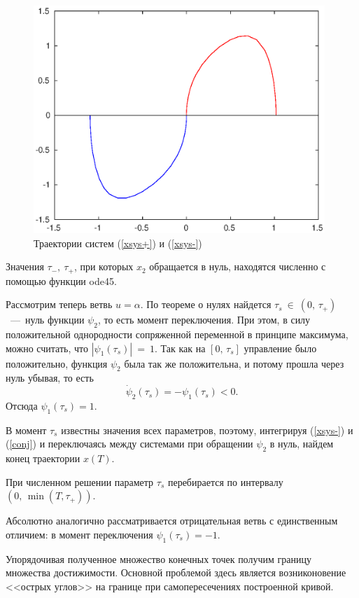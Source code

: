 \documentclass[16pt]{article}
\begin{document}
\begin{figure}[h]\label{pict}
\center
\includegraphics[width=110mm]{start.eps}
\caption{Траектории систем (\ref{xsys+}) и (\ref{xsys-})}
\end{figure}


Значения $\tau_-,\ \tau_+$, при которых $x_2$ обращается в нуль, находятся численно с помощью функции ode45. 

Рассмотрим теперь ветвь $u = \alpha$. По теореме о нулях найдется $\tau_s~\in~(0,\, \tau_+)$~---~нуль функции $\psi_2$, то есть момент переключения. При этом, в силу положительной однородности сопряженной 
переменной в принципе максимума, можно считать, что $|\psi_1(\tau_s)|~=~1$. Так как на $[0,\,\tau_s]$ управление
было положительно, функция $\psi_2$ была так же положительна, и потому прошла через нуль убывая, то есть
$$\dot \psi_2(\tau_s) =-\psi_1(\tau_s) < 0.$$
Отсюда $\psi_1(\tau_s) = 1$. 

В момент $\tau_s$ известны значения всех параметров, поэтому, интегрируя (\ref{xsys-}) и (\ref{conj})
и переключаясь между системами при обращении $\psi_2$ в нуль,
найдем конец траектории $x(T)$.

При численном решении параметр $\tau_s$ перебирается по интервалу $(0,\,\min(T, \tau_+))$.

Абсолютно аналогично рассматривается отрицательная ветвь с единственным отличием: в момент переключения
$\psi_1(\tau_s) = -1$.

Упорядочивая полученное множество конечных точек получим границу множества достижимости. Основной проблемой 
здесь является возниконовение <<острых углов>> на границе при самопересечениях построенной кривой.
\end{document}
